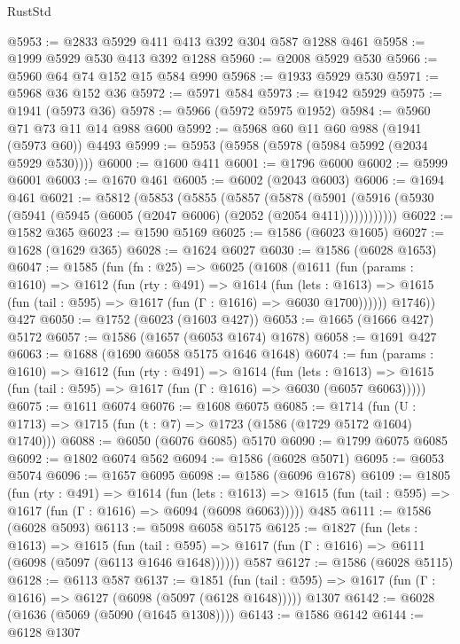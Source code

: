 \begin{lexlean}{RustStd}
\begin{coremodule}
@5953 := @2833 @5929 @411 @413 @392 @304 @587 @1288 @461
@5958 := @1999 @5929 @530 @413 @392 @1288
@5960 := @2008 @5929 @530
@5966 := @5960 @64 @74 @152 @15 @584 @990
@5968 := @1933 @5929 @530
@5971 := @5968 @36 @152 @36
@5972 := @5971 @584
@5973 := @1942 @5929
@5975 := @1941 (@5973 @36)
@5978 := @5966 (@5972 @5975 @1952)
@5984 := @5960 @71 @73 @11 @14 @988 @600
@5992 := @5968 @60 @11 @60 @988 (@1941 (@5973 @60)) @4493
@5999 := @5953 (@5958 (@5978 (@5984 @5992 (@2034 @5929 @530))))
@6000 := @1600 @411
@6001 := @1796 @6000
@6002 := @5999 @6001
@6003 := @1670 @461
@6005 := @6002 (@2043 @6003)
@6006 := @1694 @461
@6021 := @5812
    (@5853
      (@5855
        (@5857
          (@5878
            (@5901 (@5916 (@5930 (@5941 (@5945 (@6005 (@2047 @6006) (@2052 (@2054 @411))))))))))))
@6022 := @1582 @365
@6023 := @1590 @5169
@6025 := @1586 (@6023 @1605)
@6027 := @1628 (@1629 @365)
@6028 := @1624 @6027
@6030 := @1586 (@6028 @1653)
@6047 := @1585
    (fun (fn : @25) =>
    @6025
      (@1608
        (@1611
          (fun (params : @1610) =>
          @1612
            (fun (rty : @491) =>
            @1614
              (fun (lets : @1613) =>
              @1615 (fun (tail : @595) => @1617 (fun (Γ : @1616) => @6030 @1700))))))
        @1746))
    @427
@6050 := @1752 (@6023 (@1603 @427))
@6053 := @1665 (@1666 @427) @5172
@6057 := @1586 (@1657 (@6053 @1674) @1678)
@6058 := @1691 @427
@6063 := @1688 (@1690 @6058 @5175 @1646 @1648)
@6074 := fun (params : @1610) =>
  @1612
    (fun (rty : @491) =>
    @1614
      (fun (lets : @1613) =>
      @1615 (fun (tail : @595) => @1617 (fun (Γ : @1616) => @6030 (@6057 @6063)))))
@6075 := @1611 @6074
@6076 := @1608 @6075
@6085 := @1714 (fun (U : @1713) => @1715 (fun (t : @7) => @1723 (@1586 (@1729 @5172 @1604) @1740)))
@6088 := @6050 (@6076 @6085) @5170
@6090 := @1799 @6075 @6085
@6092 := @1802 @6074 @562
@6094 := @1586 (@6028 @5071)
@6095 := @6053 @5074
@6096 := @1657 @6095
@6098 := @1586 (@6096 @1678)
@6109 := @1805
    (fun (rty : @491) =>
    @1614
      (fun (lets : @1613) =>
      @1615 (fun (tail : @595) => @1617 (fun (Γ : @1616) => @6094 (@6098 @6063)))))
    @485
@6111 := @1586 (@6028 @5093)
@6113 := @5098 @6058 @5175
@6125 := @1827
    (fun (lets : @1613) =>
    @1615
      (fun (tail : @595) => @1617 (fun (Γ : @1616) => @6111 (@6098 (@5097 (@6113 @1646 @1648))))))
    @587
@6127 := @1586 (@6028 @5115)
@6128 := @6113 @587
@6137 := @1851
    (fun (tail : @595) => @1617 (fun (Γ : @1616) => @6127 (@6098 (@5097 (@6128 @1648)))))
    @1307
@6142 := @6028 (@1636 (@5069 (@5090 (@1645 @1308))))
@6143 := @1586 @6142
@6144 := @6128 @1307

\end{coremodule}
\end{lexlean}
